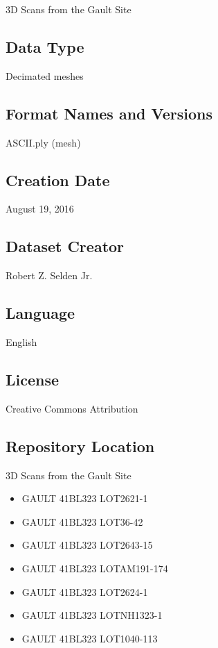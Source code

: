 \documentclass[preprint,12pt]{elsarticle}
\begin{document}
3D Scans from the Gault Site

\subsection{Data Type}

Decimated meshes

\subsection{Format Names and Versions}

ASCII.ply (mesh)

\subsection{Creation Date}

August 19, 2016

\subsection{Dataset Creator}

Robert Z. Selden Jr.

\subsection{Language}

English

\subsection{License}

Creative Commons Attribution

\subsection{Repository Location}
3D Scans from the Gault Site

\begin{itemize}

\item GAULT 41BL323 LOT2621-1 \citep{Selden:Z21}

\item GAULT 41BL323 LOT36-42 \citep{Selden:Z25}

\item GAULT 41BL323 LOT2643-15 \citep{Selden:Z24}

\item GAULT 41BL323 LOTAM191-174 \citep{Selden:Z23}

\item GAULT 41BL323 LOT2624-1 \citep{Selden:Z22}

\item GAULT 41BL323 LOTNH1323-1 \citep{Selden:Z20}

\item GAULT 41BL323 LOT1040-113 \citep{Selden:Z26}

\end{itemize}
\end{document}
